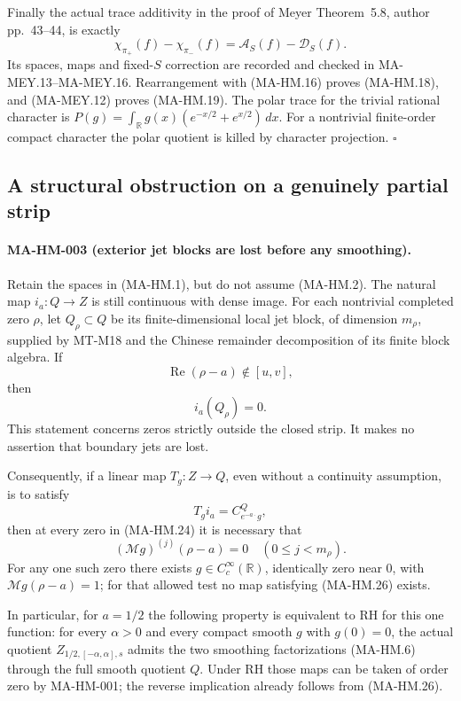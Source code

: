 Finally the actual trace additivity in the proof of
Meyer Theorem~5.8, author pp.~43--44, is exactly
\[
       \chi_{\pi_+}(f)-\chi_{\pi_-}(f)
                         =\mathcal A_S(f)-\mathcal D_S(f).
 \tag{MA-HM.23}
\]
Its spaces, maps and fixed-$S$ correction are recorded
and checked in MA-MEY.13--MA-MEY.16.  Rearrangement with
(MA-HM.16) proves (MA-HM.18), and (MA-MEY.12) proves
(MA-HM.19).  The polar trace for the trivial rational
character is
$P(g)=\int_{\mathbb R}g(x)(e^{-x/2}+e^{x/2})\,dx$.
For a nontrivial finite-order compact character the
polar quotient is killed by character projection.
\hfill$\square$

\subsection{A structural obstruction on a genuinely partial strip}

\paragraph{MA-HM-003 (exterior jet blocks are lost before any smoothing).}
Retain the spaces in (MA-HM.1), but do not assume (MA-HM.2).
The natural map $i_a:Q\to Z$ is still continuous with dense
image.  For each nontrivial completed zero $\rho$, let
$Q_\rho\subset Q$ be its finite-dimensional local jet block,
of dimension $m_\rho$, supplied by MT-M18 and the Chinese
remainder decomposition of its finite block algebra.
If
\[
              \operatorname{Re}(\rho-a)\notin[u,v],
 \tag{MA-HM.24}
\]
then
\[
                         i_a(Q_\rho)=0.
 \tag{MA-HM.25}
\]
This statement concerns zeros strictly outside the closed
strip.  It makes no assertion that boundary jets are lost.

Consequently, if a linear map $T_g:Z\to Q$, even without a
continuity assumption, is to satisfy
\[
                    T_gi_a=C_{e^{-a\cdot}g}^{Q},
 \tag{MA-HM.26}
\]
then at every zero in (MA-HM.24) it is necessary that
\[
               (\mathcal Mg)^{(j)}(\rho-a)=0
                       \quad(0\le j<m_\rho).
 \tag{MA-HM.27}
\]
For any one such zero there exists
$g\in C_c^\infty(\mathbb R)$, identically zero near $0$,
with $\mathcal Mg(\rho-a)=1$; for that allowed test
no map satisfying (MA-HM.26) exists.

In particular, for $a=1/2$ the following property is
equivalent to RH for this one function: for every
$\alpha>0$ and every compact smooth $g$ with $g(0)=0$,
the actual quotient $Z_{1/2,[-\alpha,\alpha],s}$ admits
the two smoothing factorizations (MA-HM.6) through
the full smooth quotient $Q$.  Under RH those maps
can be taken of order zero by MA-HM-001; the reverse
implication already follows from (MA-HM.26).

